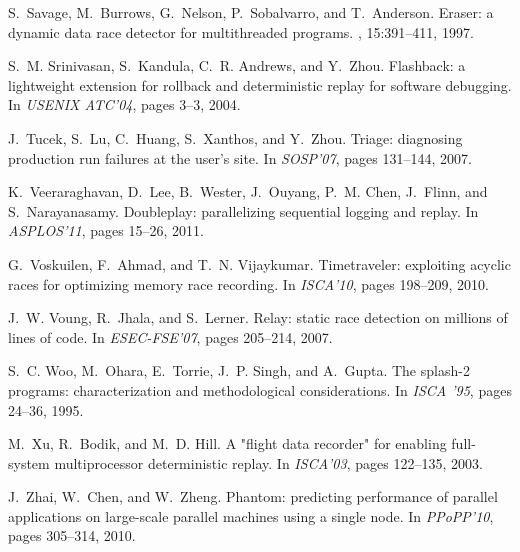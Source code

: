 \documentclass[10pt,onecolumn,letterpaper]{article}
\begin{document}
{\begin{thebibliography}{10}
S.~Savage, M.~Burrows, G.~Nelson, P.~Sobalvarro, and T.~Anderson.
\newblock Eraser: a dynamic data race detector for multithreaded programs.
, 15:391--411, 1997.

S.~M. Srinivasan, S.~Kandula, C.~R. Andrews, and Y.~Zhou.
\newblock Flashback: a lightweight extension for rollback and deterministic
  replay for software debugging.
\newblock In {\em USENIX ATC'04}, pages 3--3, 2004.

J.~Tucek, S.~Lu, C.~Huang, S.~Xanthos, and Y.~Zhou.
\newblock Triage: diagnosing production run failures at the user's site.
\newblock In {\em SOSP'07}, pages 131--144, 2007.

K.~Veeraraghavan, D.~Lee, B.~Wester, J.~Ouyang, P.~M. Chen,
J.~Flinn, and
  S.~Narayanasamy.
\newblock Doubleplay: parallelizing sequential logging and replay.
\newblock In {\em ASPLOS'11}, pages 15--26, 2011.

G.~Voskuilen, F.~Ahmad, and T.~N. Vijaykumar.
\newblock Timetraveler: exploiting acyclic races for optimizing memory race
  recording.
\newblock In {\em ISCA'10}, pages 198--209, 2010.

J.~W. Voung, R.~Jhala, and S.~Lerner.
\newblock Relay: static race detection on millions of lines of code.
\newblock In {\em ESEC-FSE'07}, pages 205--214, 2007.

S.~C. Woo, M.~Ohara, E.~Torrie, J.~P. Singh, and A.~Gupta.
\newblock The splash-2 programs: characterization and methodological
  considerations.
\newblock In {\em ISCA '95}, pages 24--36, 1995.

M.~Xu, R.~Bodik, and M.~D. Hill.
\newblock A "flight data recorder" for enabling full-system multiprocessor
  deterministic replay.
\newblock In {\em ISCA'03}, pages 122--135, 2003.

J.~Zhai, W.~Chen, and W.~Zheng.
\newblock Phantom: predicting performance of parallel applications on
  large-scale parallel machines using a single node.
\newblock In {\em PPoPP'10}, pages 305--314, 2010.

\end{thebibliography}
}
\end{document}
